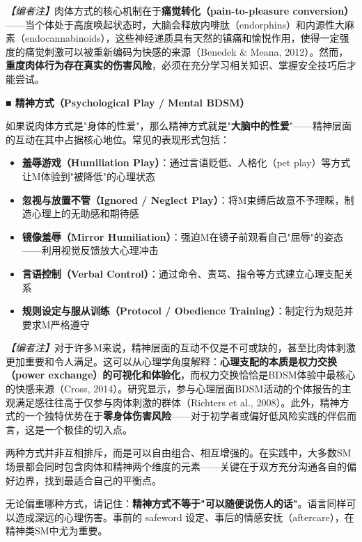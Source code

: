 \documentclass[12pt,UTF8]{ctexbook}
\begin{document}
\textit{【编者注】}肉体方式的核心机制在于\textbf{痛觉转化（pain-to-pleasure conversion）}——当个体处于高度唤起状态时，大脑会释放内啡肽（endorphins）和内源性大麻素（endocannabinoids），这些神经递质具有天然的镇痛和愉悦作用，使得一定强度的痛觉刺激可以被重新编码为快感的来源（Benedek \& Meana, 2012）。然而，\textbf{重度肉体行为存在真实的伤害风险}，必须在充分学习相关知识、掌握安全技巧后才能尝试。

\noindent\textbf{■ 精神方式（Psychological Play / Mental BDSM）}

如果说肉体方式是"身体的性爱"，那么精神方式就是"\textbf{大脑中的性爱}"——精神层面的互动在其中占据核心地位。常见的表现形式包括：

\begin{itemize}
	\item \textbf{羞辱游戏（Humiliation Play）}：通过言语贬低、人格化（pet play）等方式让M体验到"被降低"的心理状态
	\item \textbf{忽视与放置不管（Ignored / Neglect Play）}：将M束缚后故意不予理睬，制造心理上的无助感和期待感
	\item \textbf{镜像羞辱（Mirror Humiliation）}：强迫M在镜子前观看自己"屈辱"的姿态——利用视觉反馈放大心理冲击
	\item \textbf{言语控制（Verbal Control）}：通过命令、责骂、指令等方式建立心理支配关系
	\item \textbf{规则设定与服从训练（Protocol / Obedience Training）}：制定行为规范并要求M严格遵守
\end{itemize}

\textit{【编者注】}对于许多M来说，精神层面的互动不仅是不可或缺的，甚至比肉体刺激更加重要和令人满足。这可以从心理学角度解释：\textbf{心理支配的本质是权力交换（power exchange）的可视化和体验化}，而权力交换恰恰是BDSM体验中最核心的快感来源（Cross, 2014）。研究显示，参与心理层面BDSM活动的个体报告的主观满足感往往高于仅参与肉体刺激的群体（Richters et al., 2008）。此外，精神方式的一个独特优势在于\textbf{零身体伤害风险}——对于初学者或偏好低风险实践的伴侣而言，这是一个极佳的切入点。

\noindent 两种方式并非互相排斥，而是可以自由组合、相互增强的。在实践中，大多数SM场景都会同时包含肉体和精神两个维度的元素——关键在于双方充分沟通各自的偏好边界，找到最适合自己的平衡点。

\begin{tcolorbox}[colback=pink!5!white,colframe=red!50!black,title=贴心小叮咛]
无论偏重哪种方式，请记住：\textbf{精神方式不等于"可以随便说伤人的话"}。语言同样可以造成深远的心理伤害。事前的 safeword 设定、事后的情感安抚（aftercare），在精神类SM中尤为重要。
\end{tcolorbox}
\end{document}
